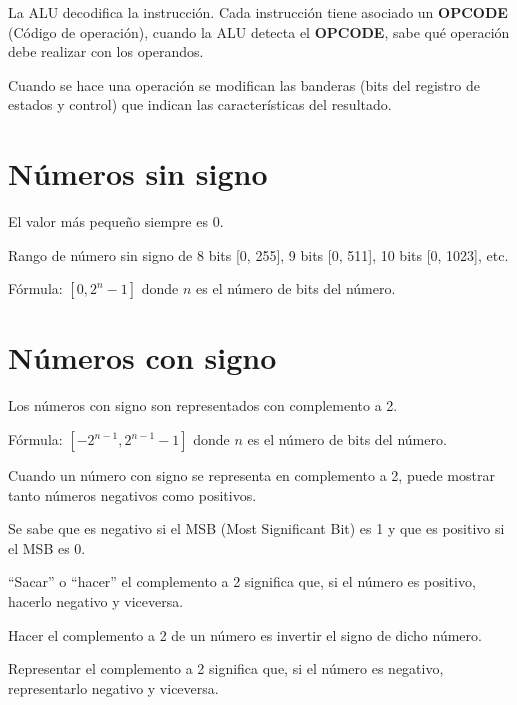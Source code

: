 \documentclass{article}
\begin{document}
\vspace{1em}
La ALU decodifica la instrucción. Cada instrucción tiene asociado un
\textbf{OPCODE} (Código de operación), cuando la ALU detecta el \textbf{OPCODE},
sabe qué operación debe realizar con los operandos.

\vspace{1em}
Cuando se hace una operación se modifican las banderas (bits del registro de
estados y control) que indican las características del resultado.

\section{Números sin signo}

El valor más pequeño siempre es 0.

\vspace{1em}
Rango de número sin signo de 8 bits [0, 255], 9 bits [0, 511], 10 bits [0, 1023],
etc.

\vspace{1em}
Fórmula: $[0, 2^{n}-1]$ donde $n$ es el número de bits del número.

\section{Números con signo}

Los números con signo son representados con complemento a 2.

\vspace{1em}
Fórmula: $[-2^{n-1}, 2^{n-1}-1]$ donde $n$ es el número de bits del número.

\vspace{1em}
Cuando un número con signo se representa en complemento a 2, puede mostrar tanto
números negativos como positivos.

\vspace{1em}
Se sabe que es negativo si el MSB (Most Significant Bit) es 1 y que es
positivo si el MSB es 0.

\vspace{1em}
``Sacar'' o ``hacer'' el complemento a 2 significa que, si el número es positivo,
hacerlo negativo y viceversa.

Hacer el complemento a 2 de un número es invertir el signo de dicho número.

\vspace{1em}
Representar el complemento a 2 significa que, si el número es negativo,
representarlo negativo y viceversa.
\end{document}
